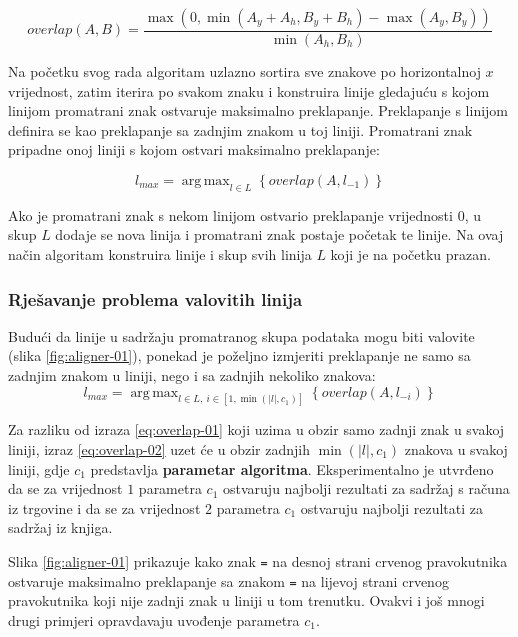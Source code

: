 \documentclass[times, utf8, zavrsni]{fer}
\DeclareMathOperator*{\argmax}{arg\,max}
\begin{document}
\begin{equation}
\label{eq:overlap}
\textit{overlap}(A, B) =
\frac{\max(0, \min( A_y + A_h, B_y + B_h ) - \max( A_y, B_y ))}{\min(A_h, B_h)}
\end{equation}

Na početku svog rada algoritam uzlazno sortira sve znakove po horizontalnoj $x$
vrijednost, zatim iterira po svakom znaku i konstruira linije gledajuću s kojom
linijom promatrani znak ostvaruje maksimalno preklapanje. Preklapanje s linijom
definira se kao preklapanje sa zadnjim znakom u toj liniji. Promatrani znak
pripadne onoj liniji s kojom ostvari maksimalno preklapanje:

\begin{equation}
\label{eq:overlap-01}
l_{max} = \argmax_{l \in L}\left\{\textit{overlap}(A, l_{-1})\right\}
\end{equation}

Ako je promatrani znak s nekom linijom ostvario preklapanje vrijednosti $0$,
u skup $L$ dodaje se nova linija i promatrani znak postaje početak te linije.
Na ovaj način algoritam konstruira linije i skup svih linija $L$ koji je na
početku prazan.


\subsubsection{Rješavanje problema valovitih linija}
Budući da linije u sadržaju promatranog skupa podataka mogu biti valovite
(slika \ref{fig:aligner-01}), ponekad je poželjno izmjeriti preklapanje ne samo
sa zadnjim znakom u liniji, nego i sa zadnjih nekoliko znakova:
\begin{equation}
\label{eq:overlap-02}
l_{max} = \argmax_{l \in L,\ i \in [1, \min(|l|, c_1)]}\left\{\textit{overlap}
(A, l_{-i})\right\}
\end{equation}

Za razliku od izraza \ref{eq:overlap-01} koji uzima u obzir samo zadnji znak u
svakoj liniji, izraz \ref{eq:overlap-02} uzet će u obzir zadnjih
$\min(|l|, c_1)$
znakova u svakoj liniji, gdje $c_1$ predstavlja \textbf{parametar algoritma}.
Eksperimentalno je utvrđeno da se za vrijednost $1$ parametra $c_1$ ostvaruju
najbolji rezultati za sadržaj s računa iz trgovine i da se za vrijednost $2$
parametra $c_1$ ostvaruju najbolji rezultati za sadržaj iz knjiga.

Slika \ref{fig:aligner-01} prikazuje kako znak \lstinline{=} na desnoj strani
crvenog pravokutnika ostvaruje maksimalno preklapanje sa znakom \lstinline{=}
na lijevoj strani crvenog pravokutnika koji nije zadnji znak u liniji u tom
trenutku. Ovakvi i još mnogi drugi primjeri opravdavaju uvođenje parametra
$c_1$.
\end{document}
